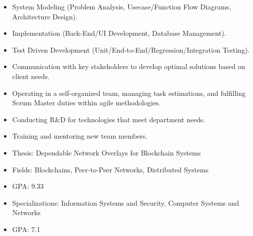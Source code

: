 \documentclass[10pt,a4paper,ragged2e,withhyper]{altacv}
\begin{document}
\begin{paracol}{2}
            \begin{itemize}
                \item System Modeling (Problem Analysis, Usecase/Function Flow Diagrams, Architecture Design).
                \item Implementation (Back-End/UI Development, Database Management).
                \item Test Driven Development (Unit/End-to-End/Regression/Integration Testing).
                \item Communication with key stakeholders to develop optimal solutions based on client needs.
                \item Operating in a self-organized team, managing task estimations, and fulfilling Scrum Master duties within agile methodologies.
                \item Conducting R\&D for technologies that meet department needs.
                \item Training and mentoring new team members.
            \end{itemize}
            
        
            \begin{itemize}
                \item[] Thesis: Dependable Network Overlays for Blockchain Systems
                \item[] Fields: Blockchains, Peer-to-Peer Networks, Distributed Systems
            \end{itemize}
            \divider
            
            \begin{itemize}
                \item[] GPA: 9.33
            \end{itemize}
            \divider

            \begin{itemize}
                \item[] Specializations: Information Systems and Security, Computer Systems and Networks
                \item[] GPA: 7.1
            \end{itemize}


\end{paracol}
\end{document}
